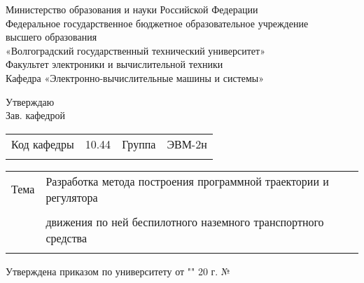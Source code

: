 \thispagestyle{empty}

\begin{nospasing}
    \begin{center}
        Министерство образования и науки Российской Федерации \\
        Федеральное государственное бюджетное образовательное учреждение \\
        высшего образования \\
        «Волгоградский государственный технический университет» \\
        Факультет электроники и вычислительной техники \\
        Кафедра «Электронно-вычислительные машины и системы» \\
    \end{center}
\end{nospasing}

\hfill
\begin{minipage}[t]{0.4\linewidth}
    Утверждаю \\
    Зав. кафедрой \\
      
\end{minipage}

\bigskip
\bigskip
\bigskip


\noindent
\begin{tabularx}{\linewidth}{@{}lXlX@{}}
    Код кафедры & 10.44 & Группа & ЭВМ-2н \\
    \cline{2-2}\cline{4-4}\\
\end{tabularx}

\noindent
\begin{tabularx}{\linewidth}{@{}lX@{}}
    Тема & Разработка метода построения программной траектории и регулятора\\
           \cline{2-2}\\
         & движения по ней беспилотного наземного транспортного средства \\
         \cline{2-2}\\
\end{tabularx}

\noindent
Утверждена приказом по университету от "\underline{\hspace{0.5cm}}" \underline{\hspace{0.5cm}} 20\underline{\hspace{0.5cm}} г. № \hrulefill\\

